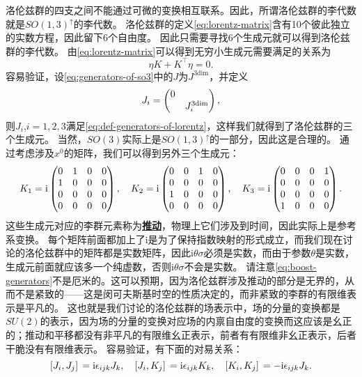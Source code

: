 \documentclass[hyperref, UTF8, a4paper]{ctexart}
\newcommand*{\ii}{\mathrm{i}}
\newcommand{\concept}[1]{\underline{\textbf{#1}}}
\begin{document}
洛伦兹群的四支之间不能通过可微的变换相互联系。因此，所谓洛伦兹群的李代数就是$SO(1,3)^\uparrow$的李代数。
洛伦兹群的定义\eqref{eq:lorentz-matrix}含有10个彼此独立的实数方程，因此留下6个自由度。
因此只需要寻找6个生成元就可以得到洛伦兹群的李代数。
由\eqref{eq:lorentz-matrix}可以得到无穷小生成元需要满足的关系为
\begin{equation}
    \eta K + K^\top \eta = 0.
    \label{eq:def-generators-of-lorentz}
\end{equation}
容易验证，设\eqref{eq:generators-of-so3}中的$J$为$J^\text{3dim}$，并定义
\begin{equation}
    J_i = \pmqty{\dmat{0 ,J^\text{3dim}_i}},
\end{equation}
则$J_i$,$i=1, 2, 3$满足\eqref{eq:def-generators-of-lorentz}，这样我们就得到了洛伦兹群的三个生成元。
当然，$SO(3)$实际上是$SO(1,3)^\uparrow$的一部分，因此这是合理的。
通过考虑涉及$x^0$的矩阵，我们可以得到另外三个生成元：
\begin{equation}
    K_1 = \ii \pmqty{0 & 1 & 0 & 0 \\ 1 & 0 & 0 & 0 \\ 0 & 0 & 0 & 0 \\ 0 & 0 & 0 & 0}, \quad 
    K_2 = \ii \pmqty{0 & 0 & 1 & 0 \\ 0 & 0 & 0 & 0 \\ 1 & 0 & 0 & 0 \\ 0 & 0 & 0 & 0}, \quad
    K_3 = \ii \pmqty{0 & 0 & 0 & 1 \\ 0 & 0 & 0 & 0 \\ 0 & 0 & 0 & 0 \\ 1 & 0 & 0 & 0}.
    \label{eq:boost-generators}
\end{equation}
这些生成元对应的李群元素称为\concept{推动}，物理上它们涉及到时间，因此实际上是参考系变换。
每个矩阵前面都加上了$\ii$是为了保持指数映射的形式成立，而我们现在讨论的洛伦兹群中的矩阵都是实数矩阵，因此$\ii \theta \sigma$必须是实数，而由于参数$\theta$是实数，生成元前面就应该多一个纯虚数，否则$\ii \theta \sigma$不会是实数。
请注意\eqref{eq:boost-generators}不是厄米的。这可以预期，因为洛伦兹群涉及推动的部分是无界的，从而不是紧致的——这是闵可夫斯基时空的性质决定的，而非紧致的李群的有限维表示是平凡的。
这也就是我们讨论的洛伦兹群的场表示中，场的分量的变换都是$SU(2)$的表示，因为场的分量的变换对应场的内禀自由度的变换而这应该是幺正的；推动和平移都没有非平凡的有限维幺正表示，前者有有限维非幺正表示，后者干脆没有有限维表示。
容易验证，有下面的对易关系：
\begin{equation}
    \comm*{J_i}{J_j} = \ii \epsilon_{ijk} J_k, \quad \comm*{J_i}{K_j} = \ii \epsilon_{ijk} K_k, \quad \comm*{K_i}{K_j} = - \ii \epsilon_{ijk} J_k.
    \label{eq:lie-algebra-lorentz}
\end{equation}
\end{document}
